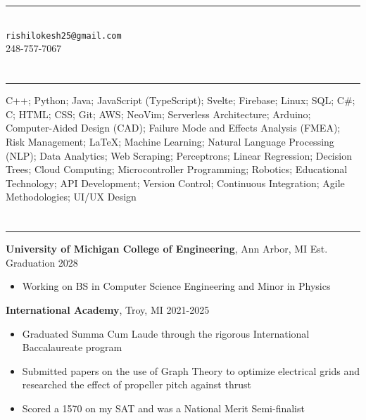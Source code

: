 \documentclass{article}[11pt]
\newcommand{\underlinedsection}[1]{ \section*{\sc{#1}}
	\rule{\textwidth}{1pt} }
\newenvironment{denseitemize} %
{ \begin{itemize}[leftmargin = 20pt, topsep = 0pt, itemsep = 0pt] }
{\end{itemize} }
\newcommand{\education}[3]{ {\textbf{#1}, {#2} \hfill {#3}} }
\begin{document}
\normalsize
\singlespacing

\section*{\centering {}} 
\begin{center}
\rule{3in}{1pt} \\
\texttt{rishilokesh25@gmail.com} \\
248-757-7067 
\end{center} 

\underlinedsection{Skills}
C++; Python; Java; JavaScript (TypeScript); Svelte; Firebase; Linux; SQL; C#; C; HTML; CSS; Git; AWS; NeoVim; Serverless Architecture; Arduino; Computer-Aided Design (CAD); Failure Mode and Effects Analysis (FMEA); Risk Management; LaTeX; Machine Learning; Natural Language Processing (NLP); Data Analytics; Web Scraping; Perceptrons; Linear Regression; Decision Trees; Cloud Computing; Microcontroller Programming; Robotics; Educational Technology; API Development; Version Control; Continuous Integration; Agile Methodologies; UI/UX Design

\underlinedsection{Education}
\education{University of Michigan College of Engineering}{Ann Arbor, MI}{Est. Graduation 2028}

\begin{denseitemize}
	\item Working on BS in Computer Science Engineering and Minor in Physics 
\end{denseitemize}
\education{International Academy}{Troy, MI}{2021-2025}
\begin{denseitemize}
	\item Graduated Summa Cum Laude through the rigorous International Baccalaureate program 
        \item Submitted papers on the use of Graph Theory to optimize electrical grids and researched the effect of propeller pitch against thrust
        \item Scored a 1570 on my SAT and was a National Merit Semi-finalist

\end{denseitemize}
\end{document}

